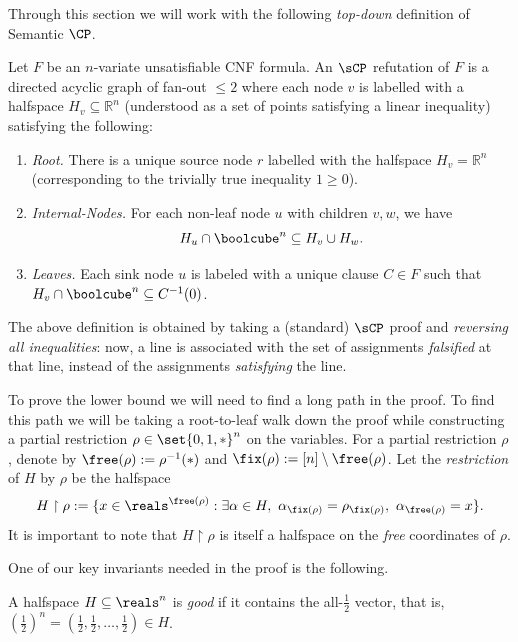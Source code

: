 Through this section we will work with the following \emph{top-down} definition of Semantic $\CP$.
\begin{definition}
	Let $F$ be an $n$-variate unsatisfiable CNF formula.
	An $\sCP$ refutation of $F$ is a directed acyclic graph of fan-out $\leq 2$ where each node $v$ is labelled with a halfspace $H_v\subseteq \mathbb{R}^n$ (understood as a set of points satisfying a linear inequality) satisfying the following:
	\begin{enumerate}
		\item \emph{Root.} There is a unique source node $r$ labelled with the halfspace $H_v=\mathbb{R}^n$ (corresponding to the trivially true inequality $1 \geq 0$).
		\item \emph{Internal-Nodes.} For each non-leaf node $u$ with children $v, w$, we have \[H_u \cap \boolcube^n \subseteq H_v \cup H_{w}.\]
		\item \emph{Leaves.} Each sink node $u$ is labeled with a unique clause $C \in F$ such that $H_v \cap \boolcube^n \subseteq C^{-1}(0)$.
	\end{enumerate}
\end{definition}
The above definition is obtained by taking a (standard) $\sCP$ proof and \emph{reversing all inequalities}: now, a line is associated with the set of assignments \emph{falsified} at that line, instead of the assignments \emph{satisfying} the line.

To prove the lower bound we will need to find a long path in the proof.
To find this path we will be taking a root-to-leaf walk down the proof while constructing a partial restriction $\rho \in \set{0,1,*}^n$ on the variables. 
For a partial restriction $\rho$, denote by $\free(\rho) := \rho^{-1}(*)$ and $\fix(\rho):= [n] \setminus \free(\rho)$. 
Let the \emph{restriction} of $H$ by $\rho$ be the halfspace
\[H \restriction \rho := \{ x \in \reals^{\free(\rho)}: \exists \alpha \in H,~ \alpha_{\fix(\rho)} = \rho_{\fix(\rho)},~ \alpha_{\free(\rho)} = x \}. \]
It is important to note that $H \restriction \rho$ is itself a halfspace on the \emph{free} coordinates of $\rho$.

One of our key invariants needed in the proof is the following.
\begin{definition}\label{def:good-halfspace}
	A halfspace $H \subseteq \reals^n$ is \emph{good} if it contains the all-$\frac{1}{2}$ vector, that is, $(\frac{1}{2})^n=(\frac{1}{2},\frac{1}{2},\ldots,\frac{1}{2}) \in H$.
\end{definition}
%
%

